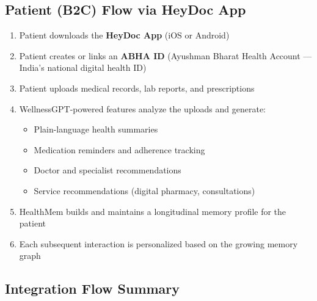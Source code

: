 \documentclass[12pt,a4paper]{article}
\begin{document}
\subsection{Patient (B2C) Flow via HeyDoc App}

\begin{enumerate}[noitemsep]
    \item Patient downloads the \textbf{HeyDoc App} (iOS or Android)
    \item Patient creates or links an \textbf{ABHA ID} (Ayushman Bharat Health Account — India's national digital health ID)
    \item Patient uploads medical records, lab reports, and prescriptions
    \item WellnessGPT-powered features analyze the uploads and generate:
    \begin{itemize}[noitemsep]
        \item Plain-language health summaries
        \item Medication reminders and adherence tracking
        \item Doctor and specialist recommendations
        \item Service recommendations (digital pharmacy, consultations)
    \end{itemize}
    \item HealthMem builds and maintains a longitudinal memory profile for the patient
    \item Each subsequent interaction is personalized based on the growing memory graph
\end{enumerate}

\subsection{Integration Flow Summary}
\end{document}
